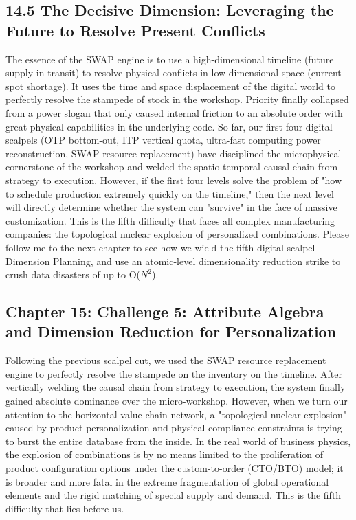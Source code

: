 \documentclass[11pt,a4paper]{article}
\begin{document}
\subsection*{14.5 The Decisive Dimension: Leveraging the Future to Resolve Present Conflicts}


The essence of the SWAP engine is to use a high-dimensional timeline (future supply in transit) to resolve physical conflicts in low-dimensional space (current spot shortage). It uses the time and space displacement of the digital world to perfectly resolve the stampede of stock in the workshop. Priority finally collapsed from a power slogan that only caused internal friction to an absolute order with great physical capabilities in the underlying code. So far, our first four digital scalpels (OTP bottom-out, ITP vertical quota, ultra-fast computing power reconstruction, SWAP resource replacement) have disciplined the microphysical cornerstone of the workshop and welded the spatio-temporal causal chain from strategy to execution. However, if the first four levels solve the problem of "how to schedule production extremely quickly on the timeline," then the next level will directly determine whether the system can "survive" in the face of massive customization. This is the fifth difficulty that faces all complex manufacturing companies: the topological nuclear explosion of personalized combinations. Please follow me to the next chapter to see how we wield the fifth digital scalpel - Dimension Planning, and use an atomic-level dimensionality reduction strike to crush data disasters of up to O($N^2$).

\subsection*{Chapter 15: Challenge 5: Attribute Algebra and Dimension Reduction for Personalization}
Following the previous scalpel cut, we used the SWAP resource replacement engine to perfectly resolve the stampede on the inventory on the timeline. After vertically welding the causal chain from strategy to execution, the system finally gained absolute dominance over the micro-workshop. However, when we turn our attention to the horizontal value chain network, a "topological nuclear explosion" caused by product personalization and physical compliance constraints is trying to burst the entire database from the inside. In the real world of business physics, the explosion of combinations is by no means limited to the proliferation of product configuration options under the custom-to-order (CTO/BTO) model; it is broader and more fatal in the extreme fragmentation of global operational elements and the rigid matching of special supply and demand. This is the fifth difficulty that lies before us.
\end{document}
